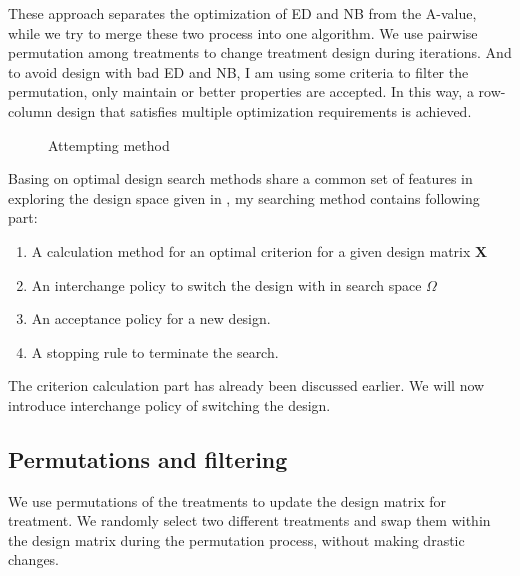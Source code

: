 \documentclass[
  a4paper,
  oneside,
  openany,
  12pt,
  onecolumn]{book}
\theoremstyle{definition}
\theoremstyle{definition}
\theoremstyle{plain}
\theoremstyle{remark}
\begin{document}
These approach separates the optimization of ED and NB from the A-value,
while we try to merge these two process into one algorithm. We use
pairwise permutation among treatments to change treatment design during
iterations. And to avoid design with bad ED and NB, I am using some
criteria to filter the permutation, only maintain or better properties
are accepted. In this way, a row-column design that satisfies multiple
optimization requirements is achieved.

\begin{figure}


\caption{\label{fig-mymethod}Attempting method}

\end{figure}%

Basing on optimal design search methods share a common set of features
in exploring the design space given in \citet{butler2013optimal}, my
searching method contains following part:

\begin{enumerate}
\def\labelenumi{\arabic{enumi}.}
\item
  A calculation method for an optimal criterion for a given design
  matrix \(\boldsymbol{X}\)
\item
  An interchange policy to switch the design with in search space
  \(\Omega\)
\item
  An acceptance policy for a new design.
\item
  A stopping rule to terminate the search.
\end{enumerate}

The criterion calculation part has already been discussed earlier. We
will now introduce interchange policy of switching the design.

\subsection{Permutations and
filtering}\label{permutations-and-filtering}

We use permutations of the treatments to update the design matrix for
treatment. We randomly select two different treatments and swap them
within the design matrix during the permutation process, without making
drastic changes.
\end{document}
